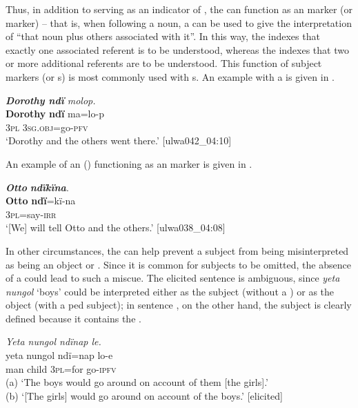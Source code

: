 Thus, in addition to serving as an indicator of , the  can function as an  marker (or  marker) -- that is, when following a noun, a  can be used to give the interpretation of “that noun plus others associated with it”. In this way, the   indexes that exactly one associated referent is to be understood, whereas the   indexes that two or more additional referents are to be understood. This  function of subject markers (or s) is most commonly used with s. An example with a   is given in .

\ea%
    \label{ex:det:18}
          \textit{\textbf{Dorothy ndï} molop.}\\
\gll    \textbf{Dorothy}  \textbf{ndï}  ma=lo-p\\
    [name]    3\textsc{pl}  3\textsc{sg.obj}=go-\textsc{pfv}\\
\glt `Dorothy and the others went there.’ [ulwa042\_04:10]
\z

An example of an  () functioning as an  marker is given in .

\ea%
    \label{ex:det:19}
          \textbf{\textit{Otto}} \textbf{\textit{ndïkïna}}.\\
\gll \textbf{Otto}  \textbf{ndï}=kï-na\\
    [name]  3\textsc{pl}=say-\textsc{irr}\\
\glt `[We] will tell Otto and the others.’ [ulwa038\_04:08]
\z

In other circumstances, the  can help prevent a subject from being misinterpreted as being an object or . Since it is common for subjects to be omitted, the absence of a  could lead to such a miscue. The elicited sentence  is ambiguous, since \textit{yeta nungol} ‘boys’ could be interpreted either as the subject (without a ) or as the object (with a ped subject); in sentence , on the other hand, the subject is clearly defined because it contains the .

\ea%
    \label{ex:det:20}
          \textit{Yeta nungol ndïnap le.}\\
\gll    yeta  nungol  ndï=nap  lo-e\\
    man  child  3\textsc{pl}=for  go-\textsc{ipfv}\\
\glt    (a) ‘The boys would go around on account of them [the girls].’\\
    (b) ‘[The girls] would go around on account of the boys.’ [elicited]
\z


